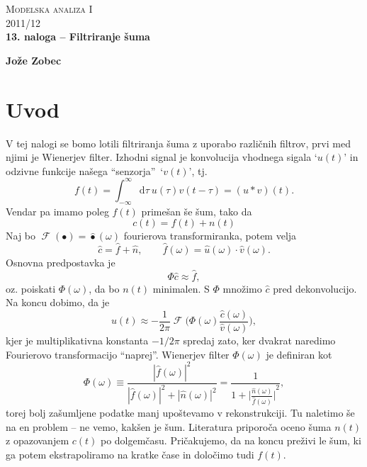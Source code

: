 \documentclass[a4 paper, 12pt]{article}
\renewcommand{\d}{
	\ensuremath{\mathrm{d}}
}
\newcommand{\F}{
	\operatorname{\mathcal{F}}
}
\newcommand{\w}{
	\ensuremath{\omega}
}
\begin{document}
\begin{center}
\textsc{Modelska analiza I}\\
\textsc{2011/12}\\[0.5cm]
\textbf{13. naloga -- Filtriranje \v suma}\\
\end{center}
\begin{flushright}
\textbf{Jože Zobec}\\
\end{flushright}

\section{Uvod}

V tej nalogi se bomo lotili filtriranja \v suma z uporabo razli\v cnih filtrov, prvi med njimi je Wienerjev filter.
Izhodni signal je konvolucija vhodnega sigala `$u(t)$' in odzivne funkcije na\v sega "`senzorja"'\ `$v(t)$', tj.
\[
	f(t) = \int_{-\infty}^{\infty} \d\tau\ u(\tau) v(t - \tau) = (u * v)(t).
\]
Vendar pa imamo poleg $f(t)$ prime\v san \v se \v sum, tako da
\[
	c(t) = f(t) + n(t)
\]
Naj bo $\F(\bullet) = \hat{\bullet}(\w)$ fourierova transformiranka, potem velja
\begin{equation}
	\hat{c} = \hat{f} + \hat{n}, \qquad \hat{f}(\w) = \hat{u}(\w)\cdot\hat{v}(\w).
\end{equation}
Osnovna predpostavka je
\begin{equation}
	\Phi \hat{c} \approx \hat{f},
\end{equation}
oz. poiskati $\Phi(\w)$, da bo $n(t)$ minimalen. S $\Phi$ mno\v zimo $\hat{c}$ pred dekonvolucijo. Na koncu
dobimo, da je
\begin{equation}
	u(t) \approx -\frac{1}{2\pi}\F\bigg(\Phi(\w) \frac{\hat{c}(\w)}{\hat{v}(\w)}\bigg),
\end{equation}
kjer je multiplikativna konstanta $-1/2\pi$ spredaj zato, ker dvakrat naredimo Fourierovo transformacijo "`naprej"'.
Wienerjev filter $\Phi(\w)$ je definiran kot
\begin{equation}
	\Phi(\w) \equiv \frac{|\hat{f}(\w)|^2}{|\hat{f}(\w)|^2 + |\hat{n}(\w)|^2} = \frac{1}{1 +
		\displaystyle{\bigg|\frac{\hat{n}(\w)}{\hat{f}(\w)}\bigg|}^2},
\end{equation}
torej bolj za\v sumljene podatke manj upo\v stevamo v rekonstrukciji. Tu naletimo
\v se na en problem -- ne vemo, kak\v sen je \v sum. Literatura priporo\v ca oceno \v suma $n(t)$ z opazovanjem $c(t)$
po dolgem\v casu. Pri\v cakujemo, da na koncu pre\v zivi le \v sum, ki ga potem ekstrapoliramo na kratke \v case in
dolo\v cimo tudi $f(t)$.
\end{document}
